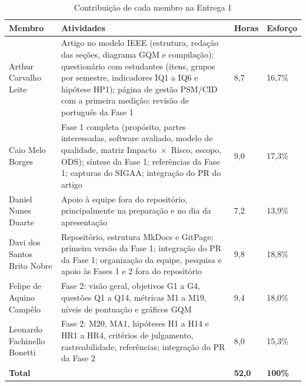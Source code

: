 \begin{table}[!h]
	\caption{Contribuição de cada membro na Entrega 1}
	\label{tab:contribuicao}
	\centering
	\footnotesize
	\begin{tabularx}{\columnwidth}{L{1.9cm} Y C{0.7cm} C{0.9cm}}
		\toprule
		\textbf{Membro} & \textbf{Atividades} & \textbf{Horas} & \textbf{Esforço} \\
		\midrule
		Arthur Carvalho Leite & Artigo no modelo IEEE (estrutura, redação das seções, diagrama GQM e compilação); questionário com estudantes (itens, grupos por semestre, indicadores IQ1 a IQ6 e hipótese HP1); página de gestão PSM/CID com a primeira medição; revisão de português da Fase 1 & 8,7 & 16,7\% \\
		Caio Melo Borges & Fase 1 completa (propósito, partes interessadas, software avaliado, modelo de qualidade, matriz Impacto~$\times$~Risco, escopo, ODS); síntese da Fase 1; referências da Fase 1; capturas do SIGAA; integração do PR do artigo & 9,0 & 17,3\% \\
		Daniel Nunes Duarte & Apoio à equipe fora do repositório, principalmente na preparação e no dia da apresentação & 7,2 & 13,9\% \\
		Davi dos Santos Brito Nobre & Repositório, estrutura MkDocs e GitPage; primeira versão da Fase 1; integração do PR da Fase 1; organização da equipe, pesquisa e apoio às Fases 1 e 2 fora do repositório & 9,8 & 18,8\% \\
		Felipe de Aquino Campêlo & Fase 2: visão geral, objetivos G1 a G4, questões Q1 a Q14, métricas M1 a M19, níveis de pontuação e gráficos GQM & 9,4 & 18,0\% \\
		Leonardo Fachinello Bonetti & Fase 2: M20, MA1, hipóteses H1 a H14 e HR1 a HR4, critérios de julgamento, rastreabilidade, referências; integração do PR da Fase 2 & 8,0 & 15,3\% \\
		\midrule
		\textbf{Total} & & \textbf{52,0} & \textbf{100\%} \\
		\bottomrule
	\end{tabularx}
\end{table}
